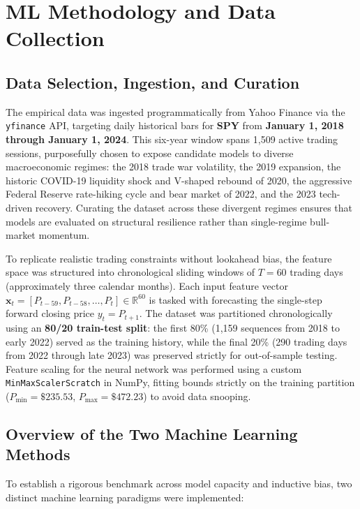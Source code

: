 \documentclass[11pt,letterpaper]{article}
\begin{document}
\newpage

\section{ML Methodology and Data Collection}

\subsection{Data Selection, Ingestion, and Curation}
The empirical data was ingested programmatically from Yahoo Finance via the \texttt{yfinance} API, targeting daily historical bars for \textbf{SPY} from \textbf{January 1, 2018 through January 1, 2024}. This six-year window spans 1,509 active trading sessions, purposefully chosen to expose candidate models to diverse macroeconomic regimes: the 2018 trade war volatility, the 2019 expansion, the historic COVID-19 liquidity shock and V-shaped rebound of 2020, the aggressive Federal Reserve rate-hiking cycle and bear market of 2022, and the 2023 tech-driven recovery. Curating the dataset across these divergent regimes ensures that models are evaluated on structural resilience rather than single-regime bull-market momentum.

To replicate realistic trading constraints without lookahead bias, the feature space was structured into chronological sliding windows of $T = 60$ trading days (approximately three calendar months). Each input feature vector $\mathbf{x}_t = [P_{t-59}, P_{t-58}, \dots, P_t] \in \mathbb{R}^{60}$ is tasked with forecasting the single-step forward closing price $y_t = P_{t+1}$. The dataset was partitioned chronologically using an \textbf{80/20 train-test split}: the first 80\% (1,159 sequences from 2018 to early 2022) served as the training history, while the final 20\% (290 trading days from 2022 through late 2023) was preserved strictly for out-of-sample testing. Feature scaling for the neural network was performed using a custom \texttt{MinMaxScalerScratch} in NumPy, fitting bounds strictly on the training partition ($P_{\min} = \$235.53$, $P_{\max} = \$472.23$) to avoid data snooping.

\subsection{Overview of the Two Machine Learning Methods}
To establish a rigorous benchmark across model capacity and inductive bias, two distinct machine learning paradigms were implemented:
\end{document}
